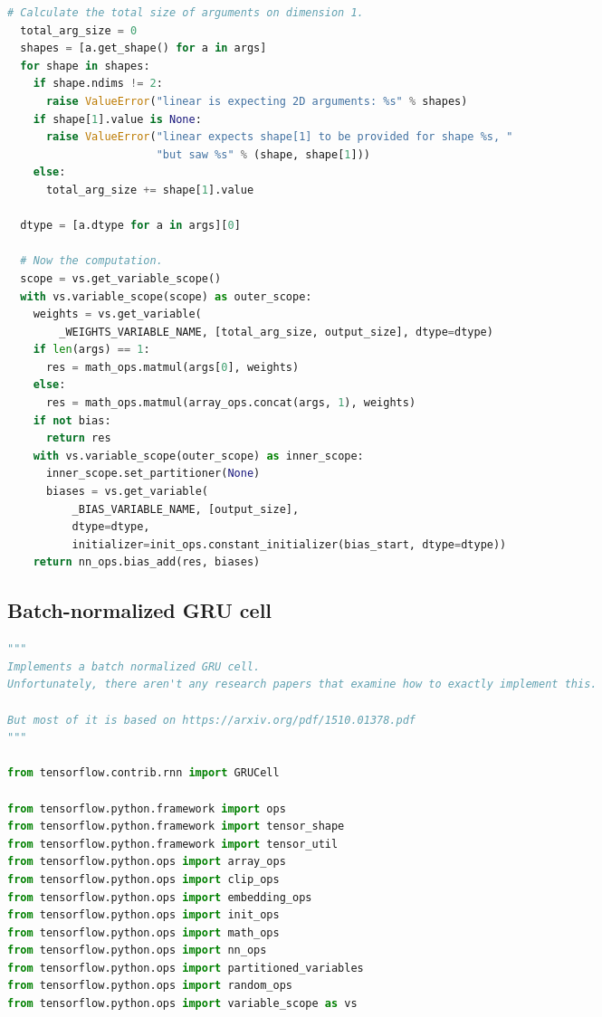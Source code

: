 \begin{landscape}
\begin{multicols}{2}
\begin{lstlisting}[language=Python]
  # Calculate the total size of arguments on dimension 1.
  total_arg_size = 0
  shapes = [a.get_shape() for a in args]
  for shape in shapes:
    if shape.ndims != 2:
      raise ValueError("linear is expecting 2D arguments: %s" % shapes)
    if shape[1].value is None:
      raise ValueError("linear expects shape[1] to be provided for shape %s, "
                       "but saw %s" % (shape, shape[1]))
    else:
      total_arg_size += shape[1].value

  dtype = [a.dtype for a in args][0]

  # Now the computation.
  scope = vs.get_variable_scope()
  with vs.variable_scope(scope) as outer_scope:
    weights = vs.get_variable(
        _WEIGHTS_VARIABLE_NAME, [total_arg_size, output_size], dtype=dtype)
    if len(args) == 1:
      res = math_ops.matmul(args[0], weights)
    else:
      res = math_ops.matmul(array_ops.concat(args, 1), weights)
    if not bias:
      return res
    with vs.variable_scope(outer_scope) as inner_scope:
      inner_scope.set_partitioner(None)
      biases = vs.get_variable(
          _BIAS_VARIABLE_NAME, [output_size],
          dtype=dtype,
          initializer=init_ops.constant_initializer(bias_start, dtype=dtype))
    return nn_ops.bias_add(res, biases)
\end{lstlisting}

\subsection{Batch-normalized GRU cell}
\begin{lstlisting}[language=Python]
"""
Implements a batch normalized GRU cell.
Unfortunately, there aren't any research papers that examine how to exactly implement this.

But most of it is based on https://arxiv.org/pdf/1510.01378.pdf
"""

from tensorflow.contrib.rnn import GRUCell

from tensorflow.python.framework import ops
from tensorflow.python.framework import tensor_shape
from tensorflow.python.framework import tensor_util
from tensorflow.python.ops import array_ops
from tensorflow.python.ops import clip_ops
from tensorflow.python.ops import embedding_ops
from tensorflow.python.ops import init_ops
from tensorflow.python.ops import math_ops
from tensorflow.python.ops import nn_ops
from tensorflow.python.ops import partitioned_variables
from tensorflow.python.ops import random_ops
from tensorflow.python.ops import variable_scope as vs


\end{lstlisting}
\end{multicols}
\end{landscape}

